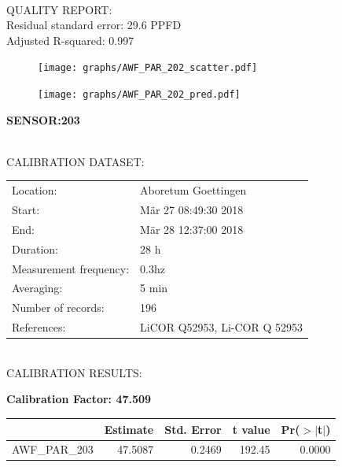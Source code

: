 \documentclass[oneside]{report}
\begin{document}
\hrulefill\\
QUALITY REPORT:\\
Residual standard error: 29.6 PPFD\\
Adjusted R-squared: 0.997



\begin{figure}[H]
  \centering
  \texttt{[image: graphs/AWF\_PAR\_202\_scatter.pdf]}
\end{figure}




\begin{figure}[H]
  \centering
  \texttt{[image: graphs/AWF\_PAR\_202\_pred.pdf]}
\end{figure}

\pagebreak


\begin{center}
\large{\textbf{SENSOR:203}}\\
\end{center}

\hrulefill\\
CALIBRATION DATASET:\\
\begin{table}[h!]
  \centering
  \label{tab:table1}
  \begin{tabular}{ll}
    Location: & Aboretum Goettingen\\ 
    
    
    Start:  & Mär 27 08:49:30 2018 \\
    End:   & Mär 28 12:37:00 2018\\ 
    Duration: & 28 h\\
    Measurement frequency: & 0.3hz\\
    Averaging:  &5 min\\
    Number of records: & 196 \\
    References: & LiCOR Q52953, Li-COR Q 52953 \\
  \end{tabular}
\end{table}

\hrulefill\\
CALIBRATION RESULTS:\\


\begin{center}
\textbf{\large{Calibration Factor: 47.509}}\\
\end{center}
\begin{table}[ht]
\centering
\begin{tabular}{rrrrr}
  \hline
 & Estimate & Std. Error & t value & Pr($>$$|$t$|$) \\ 
  \hline
AWF\_PAR\_203 & 47.5087 & 0.2469 & 192.45 & 0.0000 \\ 
   \hline
\end{tabular}
\end{table}
\end{document}

